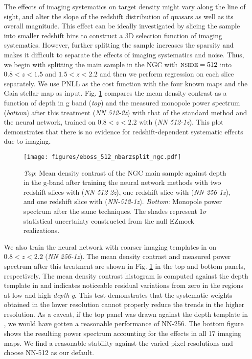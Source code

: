 The effects of imaging systematics on target density might vary along the line of sight, and alter the slope of the redshift distribution of quasars as well as its overall magnitude. This effect can be ideally investigated by slicing the sample into smaller redshift bins to construct a 3D selection function of imaging systematics. However, further splitting the sample increases the sparsity and makes it difficult to separate the effects of imaging systematics and noise. Thus, we begin with splitting the main sample in the NGC with $\textsc{nside}=512$ into $0.8<z<1.5$ and $1.5<z<2.2$ and then we perform regression on each slice separately. We use PNLL as the cost function with the four known maps and the Gaia stellar map as input. Fig. \ref{fig:nbarsplit} compares the mean density contrast as a function of depth in g band (\textit{top}) and the measured monopole power spectrum (\textit{bottom}) after this treatment (\textit{NN 512-2z}) with that of the standard method and the neural network, trained on $0.8<z<2.2$ with  (\textit{NN 512-1z}). This plot demonstrates that there is no evidence for redshift-dependent systematic effects due to imaging.

\begin{figure}
    \centering
    \texttt{[image: figures/eboss\_512\_nbarzsplit\_ngc.pdf]}
    \caption[Mean density and power spectrum of eBOSS quasars for different resolutions.]{\textit{Top}: Mean density contrast of the NGC main sample against depth in the g-band after training the neural network methods with two redshift slices with  (\textit{NN-512-2z}), one redshift slice with  (\textit{NN-256-1z}), and one redshift slice with  (\textit{NN-512-1z}). \textit{Bottom}: Monopole power spectrum after the same techniques. The shades represent 1$\sigma$ statistical uncertainty constructed from the null EZmock realizations.}
    \label{fig:nbarsplit}
\end{figure}


We also train the neural network with coarser imaging templates in  on $0.8<z<2.2$ (\textit{NN 256-1z}). The mean density contrast and measured power spectrum after this treatment are shown in Fig. \ref{fig:nbarsplit} in the top and bottom panels, respectively. The mean density contrast histogram is computed against the depth template in  and indicates noticeable residual variations from zero in the regions at low and high \textit{depth-g}. This test demonstrates that the systematic weights obtained in the lower resolution cannot properly reduce the trends in the higher resolution. As a caveat, if the top panel was drawn against the depth template in , we would have gotten a reasonable performance of NN-256. The bottom figure shows the resulting power spectrum accounting for the effects in all 17 imaging maps. We find a reasonable stability against the varied pixel resolutions and choose NN-512 as our default.

